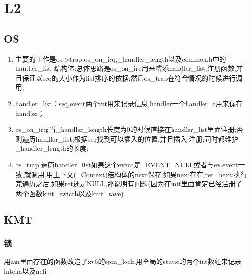 \documentclass[11pt, a4paper, UTF8]{ctexart}
\begin{document}
\section{L2}
\subsection{OS}
\begin{enumerate}
    \item 主要的工作是os->trap,os\_on\_irq,\_handler\_length以及common.h中的handler\_list 结构体;总体思路是os\_on\_irq用来增添handler\_list,注册函数,并且保证以seq的大小作为list排序的依据;然后os\_trap在符合情况的时候进行调用;
    \item handler\_list：seq,event两个int用来记录信息,handler一个handler\_t用来保存handler；
    \item os\_on\_irq:当\_handler\_length长度为0的时候直接在handler\_list里面注册;否则遍历handler\_list,根据seq找到可以插入的位置,并且插入,注册;同时都维护\_handler\_length的长度;
    \item os\_trap:遍历handler\_list如果这个event是\_EVENT\_NULL或者与ev.event一致,就调用,用上下文(\_Context)结构体的next保存;如果next存在,ret=next;执行完遍历之后,如果ret还是NULL,那说明有问题(因为在init里面肯定已经注册了两个函数kmt\_swicth以及kmt\_save)

\end{enumerate}
\subsection{KMT}
\subsubsection{锁}
用am里面存在的函数改造了xv6的spin\_lock,用全局的static的两个int数组来记录intena以及ncli;
\end{document}
